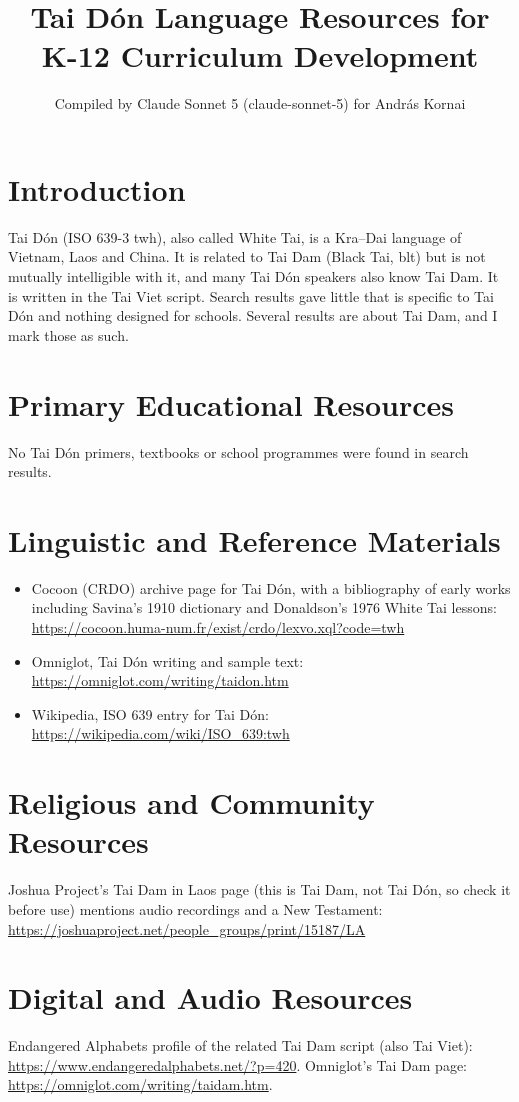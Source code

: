 \documentclass[12pt]{article}
\title{Tai D\'on Language Resources for K-12 Curriculum Development}
\author{Compiled by Claude Sonnet 5 (claude-sonnet-5) for Andr\'as Kornai}
\date{}
\begin{document}
\maketitle

\section{Introduction}
Tai D\'on (ISO 639-3 twh), also called White Tai, is a Kra--Dai language of Vietnam, Laos and China. It is related to Tai Dam (Black Tai, blt) but is not mutually intelligible with it, and many Tai D\'on speakers also know Tai Dam. It is written in the Tai Viet script. Search results gave little that is specific to Tai D\'on and nothing designed for schools. Several results are about Tai Dam, and I mark those as such.

\section{Primary Educational Resources}
No Tai D\'on primers, textbooks or school programmes were found in search results.

\section{Linguistic and Reference Materials}
\begin{itemize}
\item Cocoon (CRDO) archive page for Tai D\'on, with a bibliography of early works including Savina's 1910 dictionary and Donaldson's 1976 White Tai lessons: \url{https://cocoon.huma-num.fr/exist/crdo/lexvo.xql?code=twh}
\item Omniglot, Tai D\'on writing and sample text: \url{https://omniglot.com/writing/taidon.htm}
\item Wikipedia, ISO 639 entry for Tai D\'on: \url{https://wikipedia.com/wiki/ISO_639:twh}
\end{itemize}

\section{Religious and Community Resources}
Joshua Project's Tai Dam in Laos page (this is Tai Dam, not Tai D\'on, so check it before use) mentions audio recordings and a New Testament: \url{https://joshuaproject.net/people_groups/print/15187/LA}

\section{Digital and Audio Resources}
Endangered Alphabets profile of the related Tai Dam script (also Tai Viet): \url{https://www.endangeredalphabets.net/?p=420}. Omniglot's Tai Dam page: \url{https://omniglot.com/writing/taidam.htm}.
\end{document}
